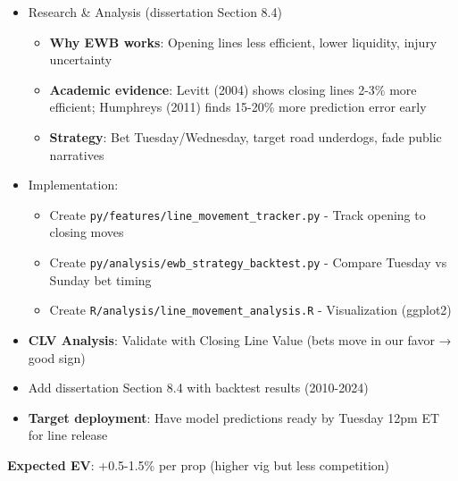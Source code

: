 \begin{itemize}
  \item {} Research \& Analysis (dissertation Section 8.4)
  \begin{itemize}
    \item \textbf{Why EWB works}: Opening lines less efficient, lower liquidity, injury uncertainty
    \item \textbf{Academic evidence}: Levitt (2004) shows closing lines 2-3\% more efficient; Humphreys (2011) finds 15-20\% more prediction error early
    \item \textbf{Strategy}: Bet Tuesday/Wednesday, target road underdogs, fade public narratives
  \end{itemize}
  \item {} Implementation:
  \begin{itemize}
    \item Create \texttt{py/features/line\_movement\_tracker.py} - Track opening to closing moves
    \item Create \texttt{py/analysis/ewb\_strategy\_backtest.py} - Compare Tuesday vs Sunday bet timing
    \item Create \texttt{R/analysis/line\_movement\_analysis.R} - Visualization (ggplot2)
  \end{itemize}
  \item {} \textbf{CLV Analysis}: Validate with Closing Line Value (bets move in our favor → good sign)
  \item {} Add dissertation Section 8.4 with backtest results (2010-2024)
  \item \textbf{Target deployment}: Have model predictions ready by Tuesday 12pm ET for line release
\end{itemize}

\textbf{Expected EV}: +0.5-1.5\% per prop (higher vig but less competition)

